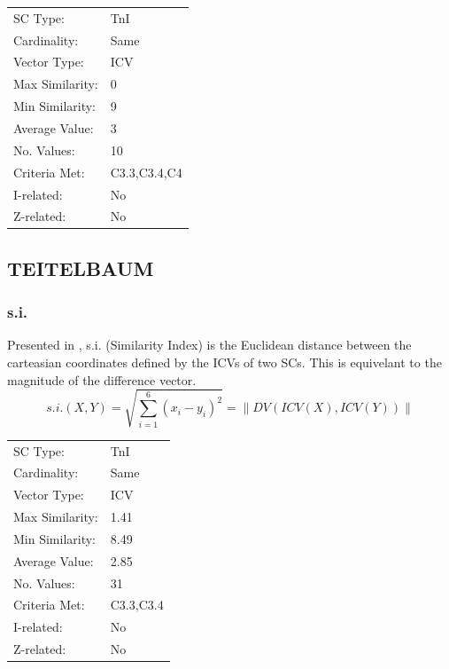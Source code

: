 \documentclass{article}
\begin{document}
\begin{center}
\begin{tabular}{ll}
 SC Type:         &  TnI           \\
 Cardinality:     &  Same          \\
 Vector Type:     &  ICV           \\
 Max Similarity:  &  0             \\
 Min Similarity:  &  9             \\
 Average Value:   &  3             \\
 No. Values:      &  10            \\
 Criteria Met:    &  C3.3,C3.4,C4  \\
 I-related:       &  No            \\
 Z-related:       &  No            \\
\end{tabular}
\end{center}
\subsection{TEITELBAUM}
\label{sec-15-3}
\subsubsection{s.i.}
\label{sec-15-3-1}

Presented in \citet[pp. 88]{Teitelbaum1965}, s.i. (Similarity Index)
is the Euclidean distance between the carteasian coordinates defined
by the ICVs of two SCs. This is equivelant to the magnitude of the
difference vector.
$$s.i.(X,Y)=\sqrt{\sum_{i=1}^{6}(x_{i}-y_{i})^{2}}=\left\|DV(ICV(X),ICV(Y))\right\|$$

\begin{center}
\begin{tabular}{ll}
 SC Type:         &  TnI        \\
 Cardinality:     &  Same       \\
 Vector Type:     &  ICV        \\
 Max Similarity:  &  1.41       \\
 Min Similarity:  &  8.49       \\
 Average Value:   &  2.85       \\
 No. Values:      &  31         \\
 Criteria Met:    &  C3.3,C3.4  \\
 I-related:       &  No         \\
 Z-related:       &  No         \\
\end{tabular}
\end{center}
\end{document}
